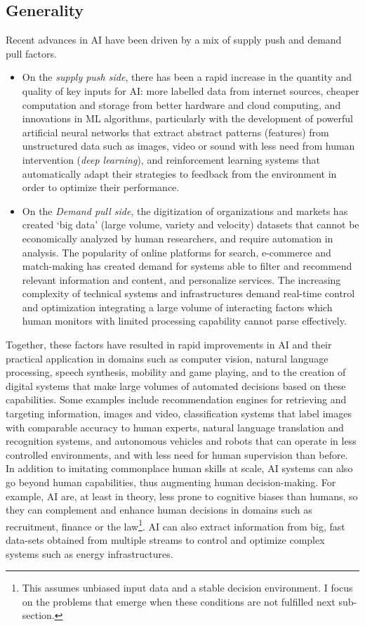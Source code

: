 \documentclass[11pt]{article}
\begin{document}
\subsection{Generality}
\label{subsec:general}
Recent advances in AI have been driven by a mix of supply push and demand pull factors. 

\begin{itemize}
    \item On the \textit{supply push side}, there has been a rapid increase in the quantity and quality of key inputs for AI: more labelled data from internet sources, cheaper computation and storage from better hardware and cloud computing, and innovations in ML algorithms, particularly with the development of powerful artificial neural networks that extract abstract patterns (features) from unstructured data such as images, video or sound with less need from human intervention (\textit{deep learning}), and reinforcement learning systems that automatically adapt their strategies to feedback from the environment in order to optimize their performance. 
    \item On the \textit{Demand pull side}, the digitization of organizations and markets has created `big data' (large volume, variety and velocity) datasets that cannot be economically analyzed by human researchers, and require automation in analysis. The popularity of online platforms for search, e-commerce and match-making has created demand for systems able to filter and recommend relevant information and content, and personalize services. The increasing complexity of technical systems and infrastructures demand real-time control and optimization integrating a large volume of interacting factors which human monitors with limited processing capability cannot parse effectively.
\end{itemize}

Together, these factors have resulted in rapid improvements in AI and their practical application in domains such as computer vision, natural language processing, speech synthesis, mobility and game playing, and to the creation of digital systems that make large volumes of automated decisions based on these capabilities. Some examples include recommendation engines for retrieving and targeting information, images and video, classification systems that label images with comparable accuracy to human experts, natural language translation and recognition systems, and autonomous vehicles and robots that can operate in less controlled environments, and with less need for human supervision than before. In addition to imitating commonplace human skills at scale, AI systems can also go beyond human capabilities, thus augmenting human decision-making. For example, AI are, at least in theory, less prone to cognitive biases than humans, so they can complement and enhance human decisions in domains such as recruitment, finance or the law\footnote{This assumes unbiased input data and a stable decision environment. I focus on the problems that emerge when these conditions are not fulfilled next sub-section.}. AI can also extract information from big, fast data-sets obtained from multiple streams to control and optimize complex systems such as energy infrastructures.
\end{document}
